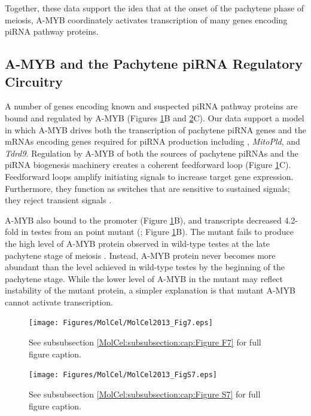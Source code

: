     Together, these data support the idea that at the onset of the pachytene phase of meiosis, A-MYB coordinately activates transcription of many genes encoding piRNA pathway proteins.

  \subsection{A-MYB and the Pachytene piRNA Regulatory Circuitry}
    \label{MolCel:subsec:A-MYB and piRNA regulatory circuitry}

    A number of genes encoding known and suspected piRNA pathway proteins are bound and regulated by A-MYB (Figures \ref{MolCel:fig:MolCelF7}B and \ref{MolCel:fig:MolCelS7}C). Our data support a model in which A-MYB drives both the transcription of pachytene piRNA genes and the mRNAs encoding genes required for piRNA production including \miwi{}, \textit{MitoPld}, and \textit{Tdrd9}. Regulation by A-MYB of both the sources of pachytene piRNAs and the piRNA biogenesis machinery creates a coherent feedforward loop (Figure \ref{MolCel:fig:MolCelF7}C). Feedforward loops amplify initiating signals to increase target gene expression. Furthermore, they function as switches that are sensitive to sustained signals; they reject transient signals \citep{Shen-Orr2002, Osella2011}. 

    A-MYB also bound to the \amyb{} promoter (Figure \ref{MolCel:fig:MolCelF7}B), and \amyb{} transcripts decreased 4.2-fold in testes from an \amyb{} point mutant (\mybrepro{}; Figure \ref{MolCel:fig:MolCelF7}B). The \amyb{} mutant fails to produce the high level of A-MYB protein observed in wild-type testes at the late pachytene stage of meiosis \citep{Bolcun-Filas2011}. Instead, A-MYB protein never becomes more abundant than the level achieved in wild-type testes by the beginning of the pachytene stage. While the lower level of A-MYB in the \amyb{} mutant may reflect instability of the mutant protein, a simpler explanation is that mutant A-MYB cannot activate \amyb{} transcription.

    \begin{figure} %
      \centering
      \texttt{[image: Figures/MolCel/MolCel2013\_Fig7.eps]}
      \caption[A-MYB Regulates Expression of mRNAs Encoding piRNA Pathway Proteins]
      {
        See subsubsection \ref{MolCel:subsubsection:cap:Figure F7} for full figure caption.
      	}
      \label{MolCel:fig:MolCelF7}
    	\end{figure}

    \begin{figure} %
      \centering 
      \texttt{[image: Figures/MolCel/MolCel2013\_FigS7.eps]}
      \caption[\amyb{} mutants, but Not \miwi{} Mutants, Change the Expression of RNA Silencing Pathway Genes]
      {
      	See subsubsection \ref{MolCel:subsubsection:cap:Figure S7} for full figure caption.
      	}
      \label{MolCel:fig:MolCelS7}
    	\end{figure}

